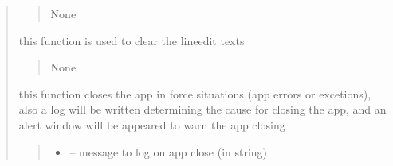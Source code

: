 \documentclass[letterpaper,10pt,english]{sphinxmanual}
\begin{document}
\begin{quote}
\begin{savenotes}
\begin{fulllineitems}
\begin{savenotes}
\begin{fulllineitems}
\begin{quote}
\begin{description}
\sphinxAtStartPar
None

\end{description}\end{quote}

\end{fulllineitems}\end{savenotes}


\begin{savenotes}\begin{fulllineitems}
\label{\detokenize{setting/setting_UI:oxin.setting_UI.UI_main_window.clear_line_edits}}
\pysigstartsignatures
{}
\pysigstopsignatures
\sphinxAtStartPar
this function is used to clear the lineedit texts
\begin{quote}\begin{description}
\sphinxAtStartPar
None

\end{description}\end{quote}

\end{fulllineitems}\end{savenotes}


\begin{savenotes}\begin{fulllineitems}
\label{\detokenize{setting/setting_UI:oxin.setting_UI.UI_main_window.close_app_force}}
\pysigstartsignatures
{}
\pysigstopsignatures
\sphinxAtStartPar
this function closes the app in force situations (app errors or excetions), also a log will be written determining the cause
for closing the app, and an alert window will be appeared to warn the app closing
\begin{quote}\begin{description}
\begin{itemize}
\item {} 
\sphinxAtStartPar
{} – message to log on app close (in string)


\end{itemize}
\end{description}
\end{quote}
\end{fulllineitems}
\end{savenotes}
\end{fulllineitems}
\end{savenotes}
\end{quote}
\end{document}
